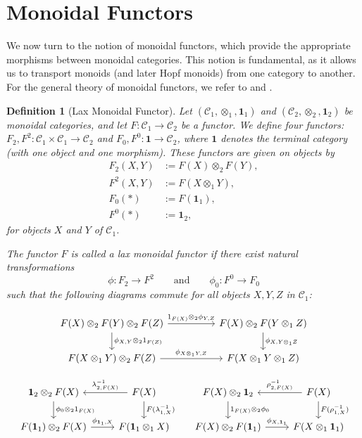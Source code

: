 \documentclass{amsart}
\newtheorem{definition}{Definition}[section]
\begin{document}
\section{Monoidal Functors}\label{sec:monoidal_functors}

We now turn to the notion of monoidal functors, which provide the appropriate morphisms between monoidal categories. This notion is fundamental, as it allows us to transport monoids (and later Hopf monoids) from one category to another. For the general theory of monoidal functors, we refer to \cite{MF} and \cite{borceux1994handbook}.

\begin{definition}[Lax Monoidal Functor]\label{def:lax_monoidal}
Let $(\mathcal{C}_1, \otimes_1, \mathbf{1}_1)$ and $(\mathcal{C}_2, \otimes_2, \mathbf{1}_2)$ be monoidal categories, and let $F \colon \mathcal{C}_1 \longrightarrow \mathcal{C}_2$ be a functor. We define four functors: $F_2, F^2 \colon \mathcal{C}_1 \times \mathcal{C}_1 \longrightarrow \mathcal{C}_2$ and $F_0, F^0 \colon \mathbf{1} \longrightarrow \mathcal{C}_2$, where $\mathbf{1}$ denotes the terminal category (with one object and one morphism). These functors are given on objects by
\begin{align*}
F_2(X, Y) &:= F(X) \otimes_2 F(Y), \\
F^2(X, Y) &:= F(X \otimes_1 Y), \\
F_0(*) &:= F(\mathbf{1}_1), \\
F^0(*) &:= \mathbf{1}_2,
\end{align*}
for objects $X$ and $Y$ of $\mathcal{C}_1$.

The functor $F$ is called a lax monoidal functor if there exist natural transformations
\[
\phi \colon F_2 \longrightarrow F^2 \qquad\text{and}\qquad \phi_0 \colon F^0 \longrightarrow F_0
\]
such that the following diagrams commute for all objects $X, Y, Z$ in $\mathcal{C}_1$:

\[
\begin{tikzcd}
F(X)\otimes_2 F(Y)\otimes_2 F(Z)\arrow{rr}{1_{F(X)}\otimes_2\phi_{Y,Z}}\arrow{d}{\phi_{X,Y}\otimes_2 1_{F(Z)}}&&F(X)\otimes_2 F(Y\otimes_1 Z)\arrow{d}{\phi_{X,Y\otimes_1 Z}}\\
F(X\otimes_1 Y)\otimes_2 F(Z)\arrow{rr}{\phi_{X\otimes_1 Y,Z}}&&F(X\otimes_1 Y\otimes_1 Z)
\end{tikzcd}
\label{eq:lax_associativity}
\]

\[
\begin{tikzcd}
\mathbf{1}_2\otimes_2F(X)\arrow{d}{\phi_0\otimes_2 1_{F(X)}}&F(X)\arrow[swap]{l}{\lambda^{-1}_{2,F(X)}}\arrow{d}{F(\lambda^{-1}_{1,X})}\\
F(\mathbf{1}_1)\otimes_2F(X)\arrow{r}{\phi_{\mathbf{1}_1,X}}&F(\mathbf{1}_1\otimes_1 X)
\end{tikzcd}
\;\;\;\;\;
\begin{tikzcd}
F(X)\otimes_2\mathbf{1}_2\arrow{d}{1_{F(X)}\otimes_2 \phi_0}&F(X)\arrow[swap]{l}{\rho^{-1}_{2,F(X)}}\arrow{d}{F(\rho^{-1}_{1,X})}\\
F(X)\otimes_2F(\mathbf{1}_1)\arrow{r}{\phi_{X,\mathbf{1}_1}}&F(X\otimes_1 \mathbf{1}_1)
\end{tikzcd}
\label{eq:lax_unit}
\]


\end{definition}
\end{document}
